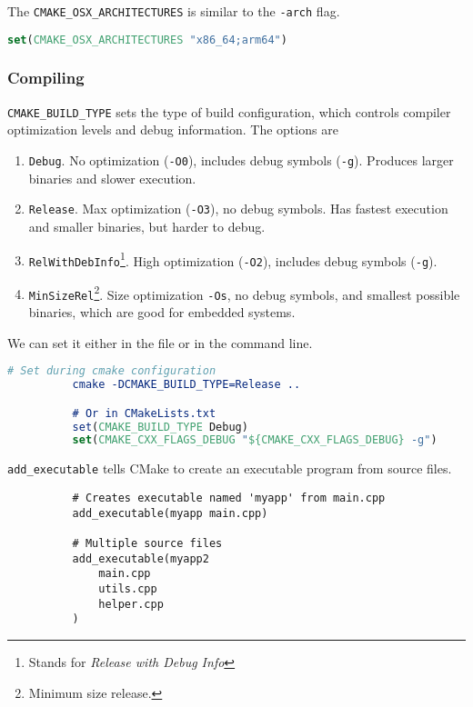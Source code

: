 \documentclass{article}
\begin{document}
      \begin{definition}[Architecture]
        The \texttt{CMAKE\_OSX\_ARCHITECTURES} is similar to the \texttt{-arch} flag. 
        \begin{lstlisting}[language=CMake]
          set(CMAKE_OSX_ARCHITECTURES "x86_64;arm64")
        \end{lstlisting}
      \end{definition} 

    \subsubsection{Compiling}

      \begin{definition}
        \texttt{CMAKE\_BUILD\_TYPE} sets the type of build configuration, which controls compiler optimization levels and debug information. The options are 
        \begin{enumerate}
          \item \texttt{Debug}. No optimization (\texttt{-O0}), includes debug symbols (\texttt{-g}). Produces larger binaries and slower execution. 
          \item \texttt{Release}. Max optimization (\texttt{-O3}), no debug symbols. Has fastest execution and smaller binaries, but harder to debug. 
          \item \texttt{RelWithDebInfo}\footnote{Stands for \textit{Release with Debug Info}}. High optimization (\texttt{-O2}), includes debug symbols (\texttt{-g}).  
          \item \texttt{MinSizeRel}\footnote{Minimum size release.}. Size optimization \texttt{-Os}, no debug symbols, and smallest possible binaries, which are good for embedded systems. 
        \end{enumerate}
        We can set it either in the file or in the command line. 
        \begin{lstlisting}[language=CMake]
          # Set during cmake configuration
          cmake -DCMAKE_BUILD_TYPE=Release ..

          # Or in CMakeLists.txt 
          set(CMAKE_BUILD_TYPE Debug)
          set(CMAKE_CXX_FLAGS_DEBUG "${CMAKE_CXX_FLAGS_DEBUG} -g")
        \end{lstlisting}
      \end{definition} 

      \begin{definition}
        \texttt{add\_executable} tells CMake to create an executable program from source files. 
        \begin{lstlisting}
          # Creates executable named 'myapp' from main.cpp
          add_executable(myapp main.cpp)  

          # Multiple source files 
          add_executable(myapp2 
              main.cpp
              utils.cpp
              helper.cpp
          )
        \end{lstlisting}
      \end{definition}
\end{document}
